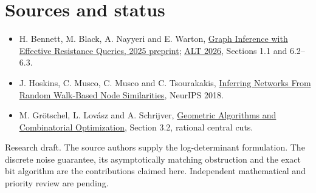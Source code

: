 \documentclass[11pt]{article}
\begin{document}
\section*{Sources and status}
\begin{itemize}
\item H. Bennett, M. Black, A. Nayyeri and E. Warton, \href{https://arxiv.org/abs/2502.18350}{Graph Inference with Effective Resistance Queries, 2025 preprint}; \href{https://proceedings.mlr.press/v313/warton26a.html}{ALT 2026}, Sections 1.1 and 6.2--6.3.
\item J. Hoskins, C. Musco, C. Musco and C. Tsourakakis, \href{https://proceedings.neurips.cc/paper_files/paper/2018/file/2f25f6e326adb93c5787175dda209ab6-Paper.pdf}{Inferring Networks From Random Walk-Based Node Similarities}, NeurIPS 2018.
\item M. Gr\"otschel, L. Lov\'asz and A. Schrijver, \href{https://www.mpi-inf.mpg.de/fileadmin/inf/d1/ellipsoid-lovasz.pdf}{Geometric Algorithms and Combinatorial Optimization}, Section 3.2, rational central cuts.
\end{itemize}
Research draft. The source authors supply the log-determinant formulation. The discrete noise guarantee, its asymptotically matching obstruction and the exact bit algorithm are the contributions claimed here. Independent mathematical and priority review are pending.
\end{document}
